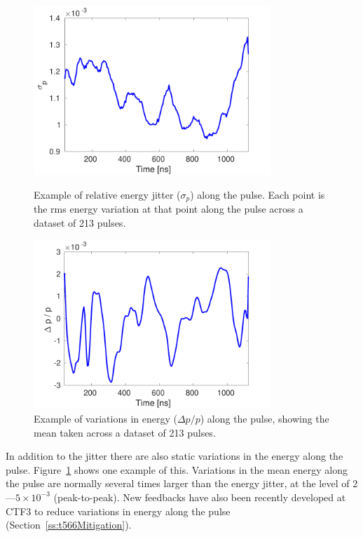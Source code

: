 \begin{figure}
  \centering
  \includegraphics[width=0.8\textwidth]{Figures/propagation/enJitter_along}
  \caption{Example of relative energy jitter (\(\sigma_p\)) along the pulse. Each point is the rms energy variation at that point along the pulse across a dataset of 213 pulses.}
  \label{f:enJitter_along}
  \includegraphics[width=0.8\textwidth]{Figures/propagation/enMeanAlong}
  \caption{Example of variations in energy (\(\Delta p/p\)) along the pulse, showing the mean taken across a dataset of 213 pulses.}
  \label{f:enMeanAlong}
\end{figure}

In addition to the jitter there are also static variations in the energy along the pulse. Figure~\ref{f:enMeanAlong} shows one example of this. Variations in the mean energy along the pulse are normally several times larger than the energy jitter, at the level of 2---\(5\times 10^{-3}\) (peak-to-peak). New feedbacks have also been recently developed at CTF3 to reduce variations in energy along the pulse (Section~\ref{ss:t566Mitigation}).

